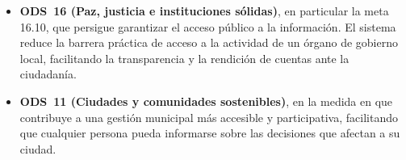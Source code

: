 \begin{itemize}
	\item \textbf{ODS~16 (Paz, justicia e instituciones sólidas)}, en particular
	la meta 16.10, que persigue garantizar el acceso público a la información. El
	sistema reduce la barrera práctica de acceso a la actividad de un órgano de
	gobierno local, facilitando la transparencia y la rendición de cuentas ante
	la ciudadanía.
	\item \textbf{ODS~11 (Ciudades y comunidades sostenibles)}, en la medida en
	que contribuye a una gestión municipal más accesible y participativa,
	facilitando que cualquier persona pueda informarse sobre las decisiones que
	afectan a su ciudad.
\end{itemize}
